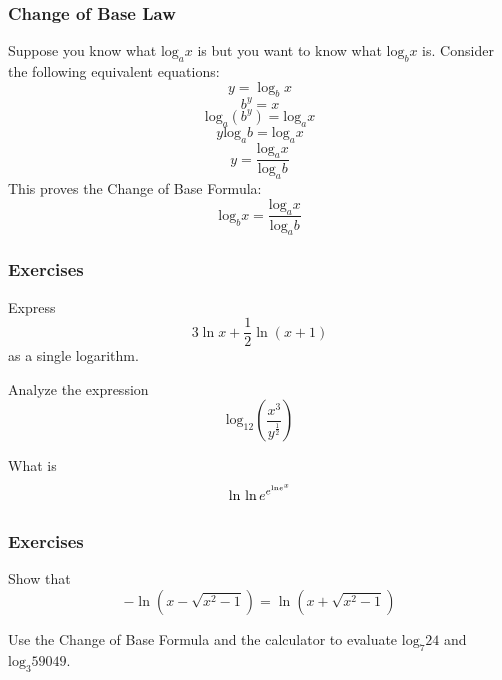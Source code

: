 \documentclass[xcolor=dvipsnames]{beamer}
\begin{document}
\begin{frame}
  \frametitle{Change of Base Law}
Suppose you know what $\mbox{log}_{a}x$ is but you want to know what
$\mbox{log}_{b}x$ is. Consider the following equivalent equations:
\begin{equation}
  \label{eq:oovaeyah}
  y=\log_{b}x
\end{equation}
\begin{equation}
  \label{eq:bahsheep}
  b^{y}=x
\end{equation}
\begin{equation}
  \label{eq:mahteizo}
  \mbox{log}_{a}(b^{y})=\mbox{log}_{a}x
\end{equation}
\begin{equation}
  \label{eq:goonaera}
  y\mbox{log}_{a}b=\mbox{log}_{a}x
\end{equation}
\begin{equation}
  \label{eq:pieghoox}
  y=\frac{\mbox{log}_{a}x}{\mbox{log}_{a}b}
\end{equation}
This proves the Change of Base Formula:
\begin{equation}
\label{eq:seengahj}
  \mbox{log}_{b}x=\frac{\mbox{log}_{a}x}{\mbox{log}_{a}b}
\end{equation}
\end{frame}

\begin{frame}
  \frametitle{Exercises}
{\ubung} Express 
\begin{equation}
\label{eq:theethee}
3\ln{}x+\frac{1}{2}\ln{}(x+1) 
\end{equation}
as a single logarithm. 

{\ubung} Analyze the expression 
\begin{equation}
\label{eq:eeghogaf}
\mbox{log}_{12}\left(\frac{x^{3}}{y^{\frac{1}{2}}}\right)
\end{equation}

{\ubung} What is 
\begin{equation}
\label{eq:ouquaiko}
\ln{}\ln{}e^{e^{\mbox{\tiny ln}e^{x}}}
\end{equation}
\end{frame}

\begin{frame}
  \frametitle{Exercises}
{\ubung} Show that 
\begin{equation}
\label{eq:nuocaeph}
-\ln{}\left(x-\sqrt{x^{2}-1}\right)=\ln{}\left(x+\sqrt{x^{2}-1}\right)
\end{equation}

{\ubung} Use the Change of Base Formula and the calculator to evaluate
$\mbox{log}_{7}24$ and $\mbox{log}_{3}59049$.
\end{frame}
\end{document}
